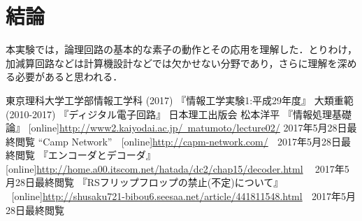 \section{結論}

本実験では，論理回路の基本的な素子の動作とその応用を理解した．とりわけ，加減算回路などは計算機設計などでは欠かせない分野であり，さらに理解を深める必要があると思われる．

\begin{thebibliography}{9}
     東京理科大学工学部情報工学科 (2017) 『情報工学実験1:平成29年度』
     大類重範 (2010-2017) 『ディジタル電子回路』 日本理工出版会
     松本洋平 『情報処理基礎論』 [online]\underline{http://www2.kaiyodai.ac.jp/~matumoto/lecture02/}
    2017年5月28日最終閲覧
     ``Camp Network'' $\;$   [online]\underline{http://capm-network.com/} $\;$ 2017年5月28日最終閲覧
     『エンコーダとデコーダ』$\;$ [online]\underline{http://home.a00.itscom.net/hatada/dc2/chap15/decoder.html} $\;\;$ 2017年5月28日最終閲覧
     『RSフリップフロップの禁止(不定)について』\\ $\;$  [online]\underline{http://shusaku721-bibou6.seesaa.net/article/441811548.html} $\;$ 2017年5月28日最終閲覧
\end{thebibliography}


